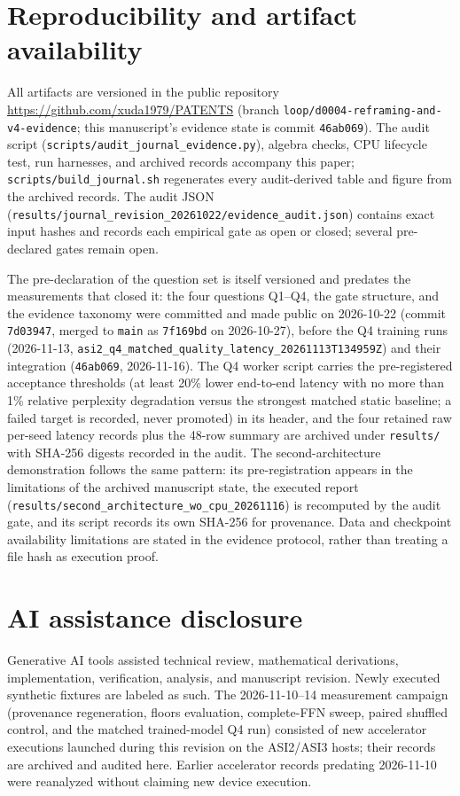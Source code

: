 \section*{Reproducibility and artifact availability}
All artifacts are versioned in the public repository
\url{https://github.com/xuda1979/PATENTS} (branch
\texttt{loop/d0004-reframing-and-v4-evidence}; this manuscript's evidence
state is commit \texttt{46ab069}). The audit script
(\texttt{scripts/audit\_journal\_evidence.py}), algebra checks, CPU
lifecycle test, run harnesses, and archived records accompany this paper;
\texttt{scripts/build\_journal.sh} regenerates every audit-derived table and
figure from the archived records. The audit JSON
(\texttt{results/journal\_revision\_20261022/evidence\_audit.json}) contains
exact input hashes and records each empirical gate as open or closed;
several pre-declared gates remain open.

The pre-declaration of the question set is itself versioned and predates the
measurements that closed it: the four questions Q1--Q4, the gate structure,
and the evidence taxonomy were committed and made public on 2026-10-22
(commit \texttt{7d03947}, merged to \texttt{main} as \texttt{7f169bd} on
2026-10-27), before the Q4 training runs (2026-11-13,
\texttt{asi2\_q4\_matched\_quality\_latency\_20261113T134959Z}) and their
integration (\texttt{46ab069}, 2026-11-16). The Q4 worker script carries the
pre-registered acceptance thresholds (at least 20\% lower end-to-end latency
with no more than 1\% relative perplexity degradation versus the strongest
matched static baseline; a failed target is recorded, never promoted) in its
header, and the four retained raw per-seed latency records plus the 48-row
summary are archived under \texttt{results/} with SHA-256 digests recorded in
the audit. The second-architecture demonstration follows the same pattern:
its pre-registration appears in the limitations of the archived manuscript
state, the executed report
(\texttt{results/second\_architecture\_wo\_cpu\_20261116}) is recomputed by
the audit gate, and its script records its own SHA-256 for provenance. Data
and checkpoint availability limitations are stated in the
evidence protocol, rather than treating a file hash as execution proof.

\section*{AI assistance disclosure}
Generative AI tools assisted technical review, mathematical derivations,
implementation, verification, analysis, and manuscript revision. Newly
executed synthetic fixtures are labeled as such. The 2026-11-10--14
measurement campaign (provenance regeneration, floors evaluation,
complete-FFN sweep, paired shuffled control, and the matched
trained-model Q4 run) consisted of new accelerator executions launched
during this revision on the ASI2/ASI3 hosts; their records are archived
and audited here. Earlier accelerator records predating 2026-11-10 were
reanalyzed without claiming new device execution.

